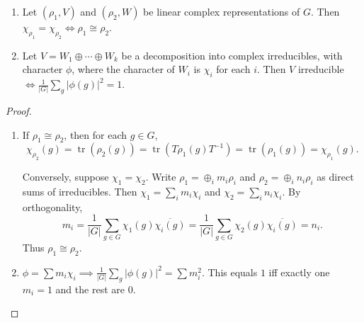 \begin{cor}\label{cor:Schur eq and irreducible}

\begin{enumerate}
\item Let $(\rho_1,V)$ and $(\rho_2,W)$ be linear complex representations of $G$. Then $\chi_{\rho_1}= \chi_{\rho_2} \iff \rho_1\cong \rho_2.$

    \item Let $V = W_1 \oplus \cdots \oplus W_k$ be a decomposition into complex irreducibles, with character $\phi$, where the character of $W_i$ is $\chi_i$ for each $i$. Then $V$ irreducible $\iff \frac{1}{|G|} \sum_g |\phi(g)|^2 = 1$.
\end{enumerate}
\end{cor}

\begin{proof}
\begin{enumerate}
    
\item If \(\rho_1 \cong \rho_2\), then for each \(g \in G\),
\[
\chi_{\rho_2}(g) = \operatorname{tr}(\rho_2(g)) = \operatorname{tr}(T \rho_1(g) T^{-1}) = \operatorname{tr}(\rho_1(g)) = \chi_{\rho_1}(g).
\]

Conversely, suppose $\chi_1 = \chi_2$. Write $\rho_1 = \oplus_i m_i \rho_i$ and $\rho_2 = \oplus_i n_i \rho_i$ as direct sums of irreducibles. Then $\chi_1 = \sum_i m_i \chi_i$ and $\chi_2 = \sum_i n_i \chi_i$. By orthogonality,
\[
m_i = \frac{1}{|G|} \sum_{g \in G} \chi_1(g) \overline{\chi_i(g)}
= \frac{1}{|G|} \sum_{g \in G} \chi_2(g) \overline{\chi_i(g)}
= n_i.
\]
Thus $\rho_1 \cong \rho_2$.



\item $\phi = \sum m_i \chi_i \implies \frac{1}{|G|} \sum_g |\phi(g)|^2 = \sum m_i^2$. This equals $1$ iff exactly one $m_i = 1$ and the rest are $0$.


\end{enumerate}
\end{proof}
